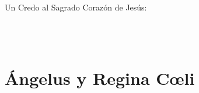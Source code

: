 \documentclass[10pt,oneside]{book}
\begin{document}
Un Credo al Sagrado Corazón de Jesús:
\begin{paracol}{2}  
      
      \vspace{2mm}
      \switchcolumn
      
      \switchcolumn*
      
      \vspace{2mm}
      \switchcolumn
      
      \switchcolumn*
      
      \vspace{2mm}
      \switchcolumn
      
      \switchcolumn*
      \\
      
      \vspace{2mm}
      \switchcolumn
      \\
      
      \switchcolumn*
      
      \vspace{2mm}
      \switchcolumn
      
      \switchcolumn*
       
      \switchcolumn
                                                                            
\end{paracol}
\chapter*{Ángelus y Regina C{\oe}li}

\section*{}
\end{document}
